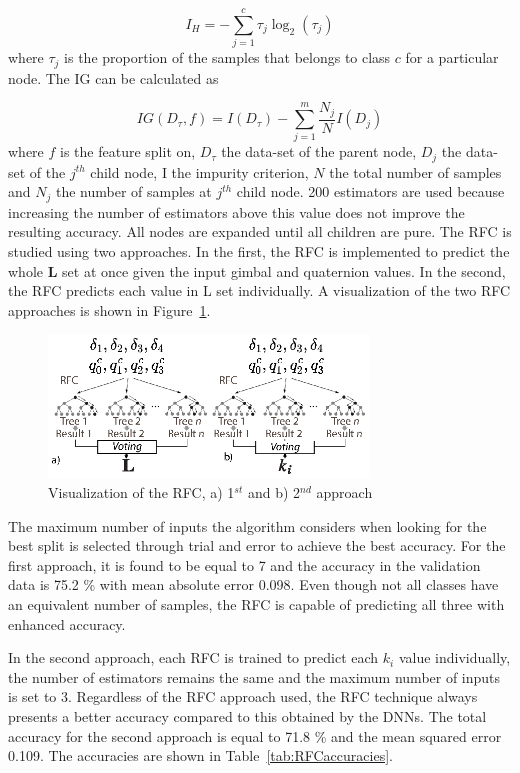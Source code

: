 \documentclass[aerospace,article,submit,moreauthors,dvi2pdf]{Definitions/mdpi}
\begin{document}
\begin{equation}
I_{H}=-\sum_{j=1}^{c} \tau_{j}\log _{2}\left(\tau_{j}\right)
\end{equation}
where $\tau_j$ is the proportion of the samples that belongs to class $c$ for a particular node.
The IG can be calculated as 

\begin{equation}
I G\left(D_{\tau}, f\right)=I\left(D_{\tau}\right)-\sum_{j=1}^{m} \frac{N_{j}}{N} I\left(D_{j}\right)
\end{equation}
where $f$ is the feature split on, $D_\tau$ the data-set of the parent node, $D_j$ the data-set of the $j^{th}$ child node, I the impurity criterion, $N$ the total number of samples and $N_j$ the number of samples at $j^{th}$ child node. 200 estimators are used because increasing the number of estimators above this value does not improve the resulting accuracy. All nodes are expanded until all children are pure. The RFC is studied using two approaches. In the first, the RFC is implemented to predict the whole $\textbf{L}$ set at once given the input gimbal and quaternion values. In the second, the RFC predicts each value in L set individually. 
A visualization of the two RFC approaches is shown in Figure~\ref{fig:RFC_vis}.
\begin{figure}[H]
\includegraphics[width=8.5cm]{RFC_vis.eps}
\caption{\label{fig:RFC_vis}Visualization of the RFC, a) 1$^{st}$ and b) 2$^{nd}$ approach}
\end{figure}

The maximum number of inputs the algorithm considers when looking for the best split is selected through trial and error to achieve the best accuracy. For the first approach, it is found to be equal to 7 and the accuracy in the validation data is 75.2 \% with mean absolute error 0.098. Even though not all classes have an equivalent number of samples, the RFC is capable of predicting all three with enhanced accuracy.

In the second approach, each RFC is trained to predict each $k_i$ value individually, the number of estimators remains the same and the maximum number of inputs is set to 3. Regardless of the RFC approach used, the RFC technique always presents a better accuracy compared to this obtained by the DNNs.  
The total accuracy for the second approach is equal to 71.8 \% and the mean squared error 0.109. The accuracies are shown in Table~\ref{tab:RFCaccuracies}.
\end{document}
